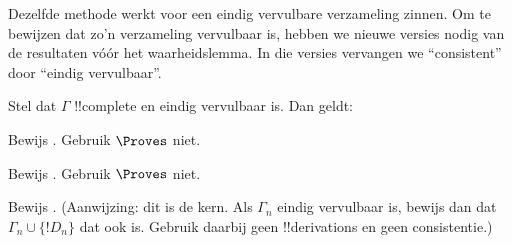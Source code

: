 \documentclass[openany]{memoir}
\begin{document}
Dezelfde methode werkt voor een eindig vervulbare verzameling zinnen. Om
te bewijzen dat zo'n verzameling vervulbaar is, hebben we nieuwe versies
nodig van de resultaten vóór het waarheidslemma. In die versies vervangen
we ``consistent'' door ``eindig vervulbaar''.

\begin{prop}
Stel dat $\Gamma$ !!{complete} en eindig vervulbaar is. Dan geldt:
\begin{enumerate}


\end{enumerate}
\end{prop}

\begin{prob}
Bewijs . Gebruik $\Proves$ niet.
\end{prob}
\tagendprob

\begin{prob}
Bewijs . Gebruik $\Proves$ niet.
\end{prob}
\tagendprob


\begin{prob}
Bewijs . (Aanwijzing: dit is de
kern. Als $\Gamma_n$ eindig vervulbaar is, bewijs dan dat $\Gamma_n
\cup \{!D_n\}$ dat ook is. Gebruik daarbij geen !!{derivation}s en geen
consistentie.)
\end{prob}
\tagendprob

\end{document}
